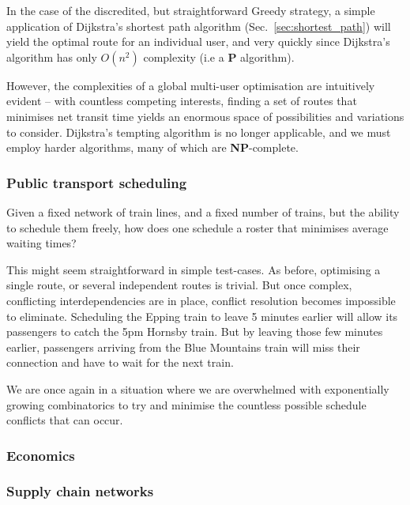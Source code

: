 In the case of the discredited, but straightforward {\sc Greedy} strategy, a simple application of Dijkstra's shortest path algorithm (Sec.~\ref{sec:shortest_path}) will yield the optimal route for an individual user, and very quickly since Dijkstra's algorithm has only $O(n^2)$ complexity (i.e a \textbf{P} algorithm).

However, the complexities of a global multi-user optimisation are intuitively evident -- with countless competing interests, finding a set of routes that minimises net transit time yields an enormous space of possibilities and variations to consider. Dijkstra's tempting algorithm is no longer applicable, and we must employ harder algorithms, many of which are \textbf{NP}-complete.

\subsubsection{Public transport scheduling}

Given a fixed network of train lines, and a fixed number of trains, but the ability to schedule them freely, how does one schedule a roster that minimises average waiting times?

This might seem straightforward in simple test-cases. As before, optimising a single route, or several independent routes is trivial. But once complex, conflicting interdependencies are in place, conflict resolution becomes impossible to eliminate. Scheduling the Epping train to leave 5 minutes earlier will allow its passengers to catch the 5pm Hornsby train. But by leaving those few minutes earlier, passengers arriving from the Blue Mountains train will miss their connection and have to wait for the next train.

We are once again in a situation where we are overwhelmed with exponentially growing combinatorics to try and minimise the countless possible schedule conflicts that can occur. 


\subsubsection{Economics}


\subsubsection{Supply chain networks}

